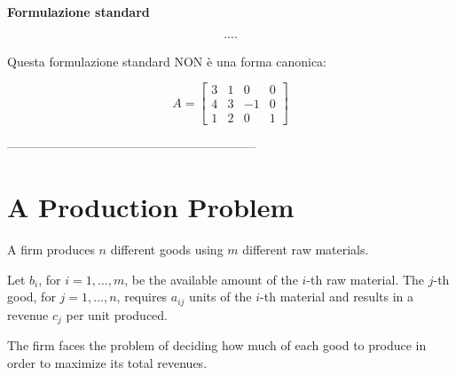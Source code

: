 \documentclass[a4paper, 11pt]{article}
\begin{document}
        \textbf{Formulazione  standard}

        \begin{align}
            ....
        \end{align}

        Questa formulazione standard NON è una forma canonica:
        
        \[
            A = 
            \begin{bmatrix}
                3 & 1 & 0 & 0 \\
                4 & 3 & -1 & 0 \\
                1 & 2 & 0 & 1 
            \end{bmatrix}
        \]


        


    
    













































------------------------------------------------------------
\section{A Production Problem}

A firm produces $n$ different goods using $m$ different raw materials.

Let $b_{i}$, for $i = 1, \dots, m$, be the available amount of the $i$-th raw material. The $j$-th good, for $j = 1, \dots, n$, requires $a_{ij}$ units of the $i$-th material and results in a revenue $c_{j}$ per unit produced.

The firm faces the problem of deciding how much of each good to produce in order to maximize its total revenues.
\end{document}

